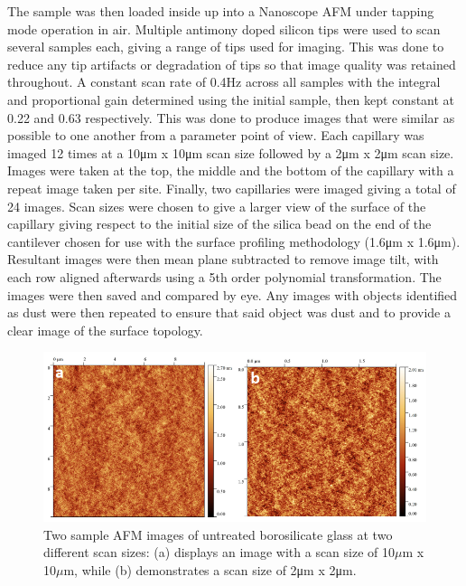 The sample was then loaded inside up into a Nanoscope AFM under tapping mode operation in air. Multiple antimony doped silicon tips were used to scan several samples each, giving a range of tips used for imaging. This was done to reduce any tip artifacts or degradation of tips so that image quality was retained throughout. A constant scan rate of 0.4Hz across all samples with the integral and proportional gain determined using the initial sample, then kept constant at 0.22 and 0.63 respectively. This was done to produce images that were similar as possible to one another from a parameter point of view. Each capillary was imaged 12 times at a 10μm x 10μm scan size followed by a 2μm x 2μm scan size. Images were taken at the top, the middle and the bottom of the capillary with a repeat image taken per site. Finally, two capillaries were imaged giving a total of 24 images. Scan sizes were chosen to give a larger view of the surface of the capillary giving respect to the initial size of the silica bead on the end of the cantilever chosen for use with the surface profiling methodology (1.6μm x 1.6μm). 
Resultant images were then mean plane subtracted to remove image tilt, with each row aligned afterwards using a 5th order polynomial transformation. The images were then saved and compared by eye. Any images with objects identified as dust were then repeated to ensure that said object was dust and to provide a clear image of the surface topology.

\begin{figure}[h]     %
        \begin{center}
          \includegraphics[width=120mm]{chapter3/Figure9.png}
\end{center}
\caption{Two sample AFM images of untreated borosilicate glass at two different scan sizes: (a) displays an image with a scan size of 10$\mu$m x 10$\mu$m, while (b) demonstrates a scan size of 2μm x 2μm.}
\label{fig:figure9}                 %
\end{figure}   
  
